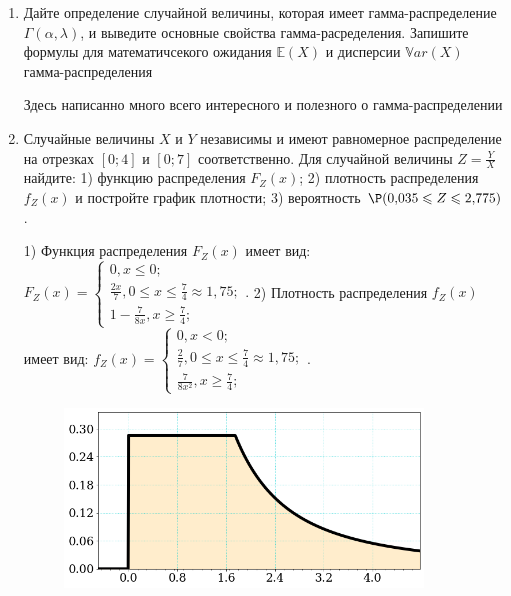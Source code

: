 \documentclass[a4paper,14pt]{article}
\begin{document}
\begin{enumerate}


\item

Дайте определение случайной величины, которая имеет гамма-распределение $\Gamma(\alpha,  \lambda)$, и выведите основные свойства гамма-расределения. Запишите формулы для математичсекого ожидания
$\mathbb{E}(X)$ и дисперсии $\mathbb{V}ar(X)$ гамма-распределения




Здесь написанно много всего интересного и полезного о гамма-распределении


\item



Случайные величины $X$ и $Y$ независимы и имеют равномерное
распределение на отрезках $[0;4]$ и $[0;7]$ соответственно. Для случайной величины $Z=\frac{Y}{X}$ найдите: 
1) функцию распределения $F_Z(x)$;
2) плотность распределения $f_Z(x)$ и постройте график плотности;
3) вероятность $\P(0,\!035\leqslant Z\leqslant 2,\!775)$.




1) Функция распределения $F_Z(x)$ имеет вид:
$
F_Z(x)=\left\{
\begin{array}{l}
0, x\leqslant 0;\\
\frac{2 x}{7}, 0\leqslant x\leqslant \frac{7}{4}\approx 1,\!75;\\
1 - \frac{7}{8 x}, x\geqslant\frac{7}{4};
\end{array}.
\right.
$
2) Плотность распределения $f_Z(x)$ имеет вид:
$
f_Z(x)=\left\{
\begin{array}{l}
0, x<0;\\
\frac{2}{7}, 0\leqslant x\leqslant \frac{7}{4}\approx 1,\!75;\\
\frac{7}{8 x^{2}}, x\geqslant\frac{7}{4};
\end{array}.
\right.
$


\begin{figure}[H]
    \includegraphics[width=0.9\textwidth]{2_53d12}
\end{figure}



\end{enumerate}
\end{document}
